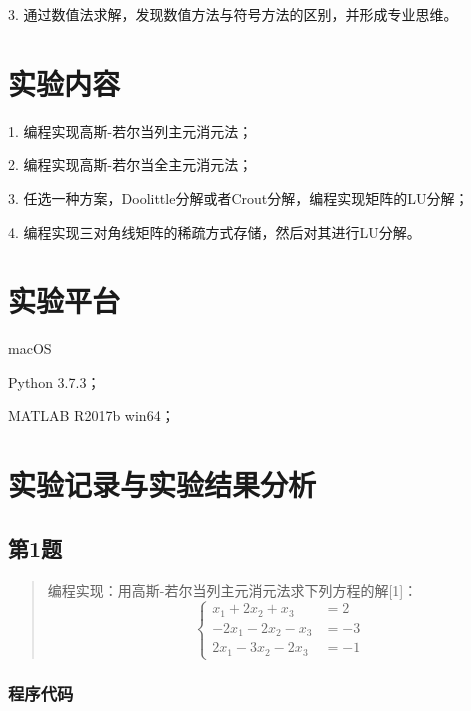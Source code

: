 \documentclass[UTF8, a4paper, zihao=-4, bibliography=totoc]{ctexart}
\begin{document}
3. 通过数值法求解，发现数值方法与符号方法的区别，并形成专业思维。

\section{实验内容}

1. 编程实现高斯-若尔当列主元消元法；

2. 编程实现高斯-若尔当全主元消元法；

3. 任选一种方案，Doolittle分解或者Crout分解，编程实现矩阵的LU分解；

4. 编程实现三对角线矩阵的稀疏方式存储，然后对其进行LU分解。

\section{实验平台}

macOS

Python 3.7.3；

MATLAB R2017b win64；

\section{实验记录与实验结果分析}

\subsection{第1题}
\begin{quote}
    {\kaishu
        编程实现：用高斯-若尔当列主元消元法求下列方程的解[1]：
    }
    \begin{equation}
        \left\{\begin{aligned}
            x_{1}+2 x_{2}+x_{3}     &=  2   \\
            -2 x_{1}-2 x_{2}-x_{3}  &=  -3  \\
            2 x_{1}-3 x_{2}-2 x_{3} &=  -1 
        \end{aligned}\right.
    \end{equation}
\end{quote}

\subsubsection{程序代码}


\end{document}
